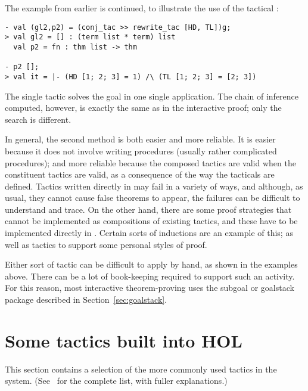 The example from earlier
is continued, to illustrate the use of the tactical \ml{>>}:

\begin{session}
\begin{verbatim}
- val (gl2,p2) = (conj_tac >> rewrite_tac [HD, TL])g;
> val gl2 = [] : (term list * term) list
  val p2 = fn : thm list -> thm

- p2 [];
> val it = |- (HD [1; 2; 3] = 1) /\ (TL [1; 2; 3] = [2; 3])
\end{verbatim}
\end{session}

\noindent The single tactic 
solves the goal in one single application. The chain of inference computed,
however, is exactly the same as in the interactive proof; only the search is
different.

In general, the second method is both easier and more reliable.  It is
easier because it does not involve writing \ML{} procedures (usually
rather complicated procedures); and more reliable because
the composed tactics are valid
 when the constituent tactics are valid,
as a consequence of the way the tacticals are defined. Tactics written
directly in \ML{} may fail
%
%
%
%
in a variety of ways, and although, as usual, they cannot cause false
theorems to appear, the failures can be difficult to understand and
trace.
On the other hand, there are some proof strategies that cannot be implemented as compositions of existing tactics, and these have to be implemented directly in \ML.
Certain sorts of inductions are an example of this; as well as tactics
to support some personal styles of proof.

Either sort of tactic can be difficult to apply by hand, as shown in the examples above.
There can be a lot of book-keeping required to support such an activity.
For this reason, most interactive theorem-proving uses the subgoal or goalstack package described in Section~\ref{sec:goalstack}.


\section{Some tactics built into HOL}

This section contains a selection of the more commonly
used tactics in the \HOL{} system. (See \REFERENCE\
for the complete list, with fuller explanations.)

